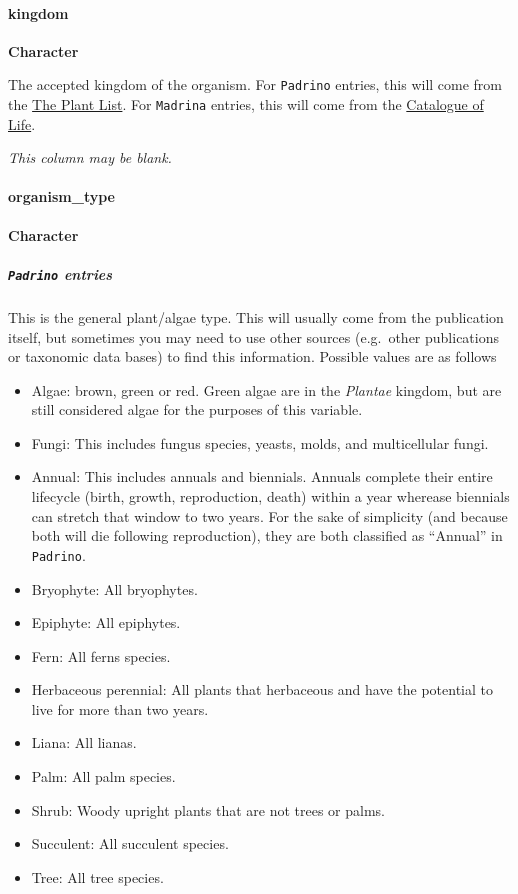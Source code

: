 \documentclass[]{article}
\let\oldparagraph\paragraph
\renewcommand{\paragraph}[1]{\oldparagraph{#1}\mbox{}}
\let\oldsubparagraph\subparagraph
\renewcommand{\subparagraph}[1]{\oldsubparagraph{#1}\mbox{}}
\begin{document}
\paragraph{kingdom}\label{kingdom}

\textbf{Character}

The accepted kingdom of the organism. For \texttt{Padrino} entries, this
will come from the \href{http://www.theplantlist.org/}{The Plant List}.
For \texttt{Madrina} entries, this will come from the
\href{http://www.catalogueoflife.org/}{Catalogue of Life}.

\emph{This column may be blank.}

\paragraph{organism\_type}\label{organism_type}

\textbf{Character}

\subparagraph{\texorpdfstring{\texttt{Padrino}
entries}{Padrino entries}}\label{padrino-entries}

This is the general plant/algae type. This will usually come from the
publication itself, but sometimes you may need to use other sources
(e.g.~other publications or taxonomic data bases) to find this
information. Possible values are as follows

\begin{itemize}
\item
  Algae: brown, green or red. Green algae are in the \emph{Plantae}
  kingdom, but are still considered algae for the purposes of this
  variable.
\item
  Fungi: This includes fungus species, yeasts, molds, and multicellular
  fungi.
\item
  Annual: This includes annuals and biennials. Annuals complete their
  entire lifecycle (birth, growth, reproduction, death) within a year
  wherease biennials can stretch that window to two years. For the sake
  of simplicity (and because both will die following reproduction), they
  are both classified as ``Annual'' in \texttt{Padrino}.
\item
  Bryophyte: All bryophytes.
\item
  Epiphyte: All epiphytes.
\item
  Fern: All ferns species.
\item
  Herbaceous perennial: All plants that herbaceous and have the
  potential to live for more than two years.
\item
  Liana: All lianas.
\item
  Palm: All palm species.
\item
  Shrub: Woody upright plants that are not trees or palms.
\item
  Succulent: All succulent species.
\item
  Tree: All tree species.
\end{itemize}
\end{document}
